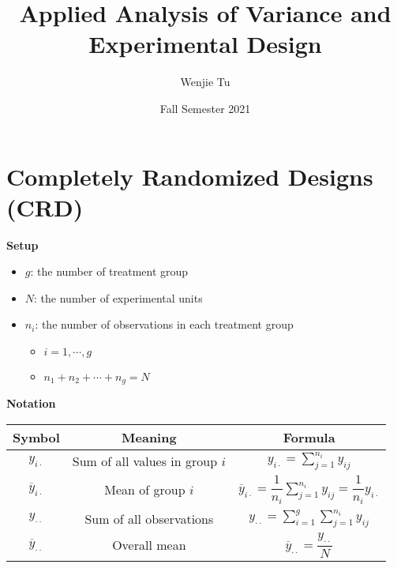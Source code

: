 \documentclass[a4paper]{article}
\title{%
    Applied Analysis of Variance and Experimental Design
}
\author{Wenjie Tu}
\date{Fall Semester 2021}
\begin{document}

\thispagestyle{empty}
\section{Completely Randomized Designs (CRD)}

\textbf{Setup}
\begin{itemize}
    \item $g$: the number of treatment group
    \item $N$: the number of experimental units
    \item $n_i$: the number of observations in each treatment group
    \begin{itemize}
        \item $i=1,\cdots,g$
        \item $n_1+n_2+\cdots+n_g=N$
    \end{itemize}
\end{itemize}


\textbf{Notation}

\begin{table}[!htbp]
    \centering
    \begin{tabular}{c|c|c}
    Symbol & Meaning & Formula \\
    \hline
    $y_{i\cdot}$ & Sum of all values in group $i$ & $y_{i\cdot}=\sum\limits_{j=1}^{n_i}y_{ij}$ \\
    \hline 
    $\overline{y}_{i\cdot}$ & Mean of group $i$ & $\overline{y}_{i\cdot}=\dfrac{1}{n_i}\sum\limits_{j=1}^{n_{i\cdot}}y_{ij}=\dfrac{1}{n_i}y_{i\cdot}$ \\
    \hline 
    $y_{\cdot\cdot}$ & Sum of all observations & $y_{\cdot\cdot}=\sum\limits_{i=1}^{g}\sum\limits_{j=1}^{n_i}y_{ij}$ \\
    \hline 
    $\overline{y}_{\cdot\cdot}$ & Overall mean & $\overline{y}_{\cdot\cdot}=\dfrac{y_{\cdot\cdot}}{N}$
    \end{tabular}
\end{table}
\end{document}
